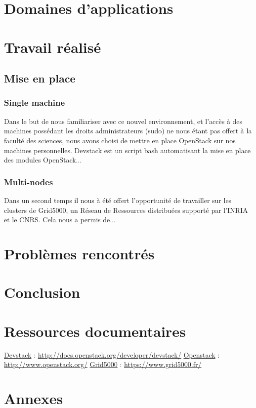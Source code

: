 \documentclass{report}
\begin{document}
\newpage
\chapter{Domaines d'applications}


\chapter{Travail réalisé}
\section{Mise en place}
\subsection{Single machine}
Dans le but de nous familiariser avec ce nouvel environnement,
et l'accès à des machines possédant les droits administrateurs (sudo)
ne nous étant pas offert à la faculté des sciences,
nous avons choisi de mettre en place OpenStack sur nos machines personnelles.\break
Devstack est un script bash automatisant la mise en place des modules OpenStack...

\subsection{Multi-nodes}
Dans un second temps il nous à été offert l'opportunité de travailler sur les clusters
de Grid5000, un Réseau de Ressources distribuées supporté par l'INRIA et le CNRS.\break
Cela nous a permis de...


\chapter{Problèmes rencontrés}



\newpage
\chapter*{Conclusion}


\newpage
\chapter*{Ressources documentaires}
\href{http://docs.openstack.org/developer/devstack/}{Devstack} :
\url{http://docs.openstack.org/developer/devstack/}
\bigbreak
\href{http://www.openstack.org/}{Openstack} :
\url{http://www.openstack.org/}
\bigbreak
\href{https://www.grid5000.fr/}{Grid5000} :
\url{https://www.grid5000.fr/}


\newpage
\chapter*{Annexes}
\end{document}
